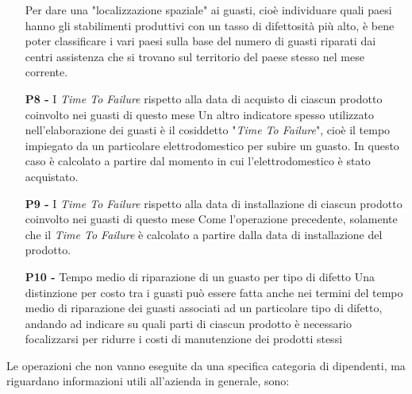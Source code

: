 \documentclass[a4paper, 12pt]{report}
\begin{document}
\begin{itemize}
		\subitem Per dare una "localizzazione spaziale" ai guasti, cioè individuare quali paesi hanno gli stabilimenti produttivi con un tasso di difettosità più alto, è bene
		poter classificare i vari paesi sulla base del numero di guasti riparati dai centri assistenza che si trovano sul territorio del paese stesso nel mese corrente.
	\item[\textbf{P8 -}] I \textit{Time To Failure} rispetto alla data di acquisto di ciascun prodotto coinvolto nei guasti di questo mese
		\subitem Un altro indicatore spesso utilizzato nell'elaborazione dei guasti è il cosiddetto "\textit{Time To Failure}", cioè il tempo impiegato da un particolare elettrodomestico
		per subire un guasto. In questo caso è calcolato a partire dal momento in cui l'elettrodomestico è stato acquistato.
	\item[\textbf{P9 -}] I \textit{Time To Failure} rispetto alla data di installazione di ciascun prodotto coinvolto nei guasti di questo mese
		\subitem Come l'operazione precedente, solamente che il \textit{Time To Failure} è calcolato a partire dalla data di installazione del prodotto.
	\item[\textbf{P10 -}] Tempo medio di riparazione di un guasto per tipo di difetto
		\subitem Una distinzione per costo tra i guasti può essere fatta anche nei termini del tempo medio di riparazione dei guasti associati ad un particolare tipo di difetto,
		andando ad indicare su quali parti di ciascun prodotto è necessario focalizzarsi per ridurre i costi di manutenzione dei prodotti stessi
\end{itemize}

Le operazioni che non vanno eseguite da una specifica categoria di dipendenti, ma riguardano informazioni utili all'azienda in generale, sono:
\end{document}
